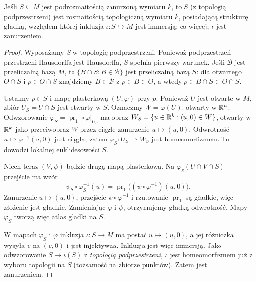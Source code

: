 \begin{stwierdzenie}\label{stw:podrozm-struktura}
Jeśli $S\subseteq M$ jest podrozmaitością zanurzoną wymiaru $k$, to $S$ (z topologią
podprzestrzeni) jest rozmaitością topologiczną wymiaru $k$, posiadającą strukturę gładką,
względem której inkluzja $\iota\colon S\hookrightarrow M$ jest immersją; co więcej, $\iota$
jest zanurzeniem.
\end{stwierdzenie}
\begin{proof}
Wyposażamy $S$ w topologię podprzestrzeni. Ponieważ podprzestrzeń
przestrzeni Hausdorffa jest Hausdorffa, $S$ spełnia pierwszy warunek.
Jeśli $\mathcal B$ jest przeliczalną bazą $M$, to
$\{B\cap S:B\in\mathcal B\}$ jest przeliczalną bazą $S$:
dla otwartego $O\cap S$ i $p\in O\cap S$ znajdziemy
$B\in\mathcal B$ z $p\in B\subset O$, a wtedy
$p\in B\cap S\subset O\cap S$.

Ustalmy $p\in S$ i mapę plasterkową $(U,\varphi)$ przy $p$.
Ponieważ $U$ jest otwarte w $M$, zbiór $U_S=U\cap S$ jest otwarty
w $S$. Oznaczmy $W=\varphi(U)$, otwarty w $\mathbb{R}^n$.
Odwzorowanie $\varphi_S=\operatorname{pr}_1\circ\varphi|_{U_S}$
ma obraz $W_S=\{u\in\mathbb{R}^k:(u,0)\in W\}$, otwarty w $\mathbb{R}^k$ jako
przeciwobraz $W$ przez ciągłe zanurzenie $u\mapsto(u,0)$.
Odwrotność $u\mapsto\varphi^{-1}(u,0)$ jest ciągła; zatem
$\varphi_S:U_S\to W_S$ jest homeomorfizmem. To dowodzi lokalnej
euklidesowości $S$.

Niech teraz $(V,\psi)$ będzie drugą mapą plasterkową. Na
$\varphi_S(U\cap V\cap S)$ przejście ma wzór
\[
\psi_S\circ\varphi_S^{-1}(u)
=\operatorname{pr}_1\bigl((\psi\circ\varphi^{-1})(u,0)\bigr).
\]
Zanurzenie $u\mapsto(u,0)$, przejście $\psi\circ\varphi^{-1}$
i rzutowanie $\operatorname{pr}_1$ są gładkie, więc złożenie jest
gładkie. Zamieniając $\varphi$ i $\psi$, otrzymujemy gładką
odwrotność. Mapy $\varphi_S$ tworzą więc atlas gładki na $S$.

W mapach $\varphi_S$ i $\varphi$ inkluzja $\iota:S\to M$ ma postać
$u\mapsto(u,0)$, a jej różniczka wysyła $v$ na $(v,0)$ i jest
injektywna. Inkluzja jest więc immersją. Jako odwzorowanie
$S\to\iota(S)$ z \emph{topologią podprzestrzeni}, $\iota$ jest
homeomorfizmem już z wyboru topologii na $S$ (tożsamość na
zbiorze punktów). Zatem jest zanurzeniem.
\end{proof}




